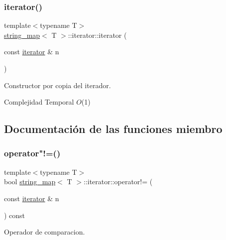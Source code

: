 \subsubsection{\texorpdfstring{iterator()}{iterator()}\hspace{0.1cm}{\footnotesize\ttfamily [2/2]}}
{\footnotesize\ttfamily template$<$typename T$>$ \\
\mbox{\hyperlink{classstring__map}{string\+\_\+map}}$<$ T $>$\+::iterator\+::iterator (\begin{DoxyParamCaption}\item[{const \mbox{\hyperlink{classstring__map_1_1iterator}{iterator}} \&}]{n }\end{DoxyParamCaption})\hspace{0.3cm}{\ttfamily [inline]}}



Constructor por copia del iterador. 


\begin{DoxyDescription}
\item[Complejidad Temporal]$O$(1)
\end{DoxyDescription}

\subsection{Documentación de las funciones miembro}
\mbox{\label{classstring__map_1_1iterator_aabc2350ae8191b4dd7102495893ea66a}} 
\subsubsection{\texorpdfstring{operator"!=()}{operator!=()}}
{\footnotesize\ttfamily template$<$typename T$>$ \\
bool \mbox{\hyperlink{classstring__map}{string\+\_\+map}}$<$ T $>$\+::iterator\+::operator!= (\begin{DoxyParamCaption}\item[{const \mbox{\hyperlink{classstring__map_1_1iterator}{iterator}} \&}]{n }\end{DoxyParamCaption}) const\hspace{0.3cm}{\ttfamily [inline]}}



Operador de comparacion. 


